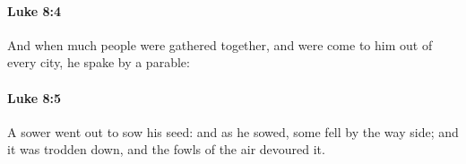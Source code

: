 		\paragraph{Luke 8:4} %
			\label{LUKE-8-4}

			And when much people were gathered together, and were come to him out of every city, he spake by a parable:

			\begin{framed}
			\scriptsize
				\begin{compactdesc}
					\item[SBLG] 
				\end{compactdesc}
			\end{framed}

		\paragraph{Luke 8:5} %
			\label{LUKE-8-5}

			A sower went out to sow his seed: and as he sowed, some fell by the way side; and it was trodden down, and the fowls of the air devoured it.

